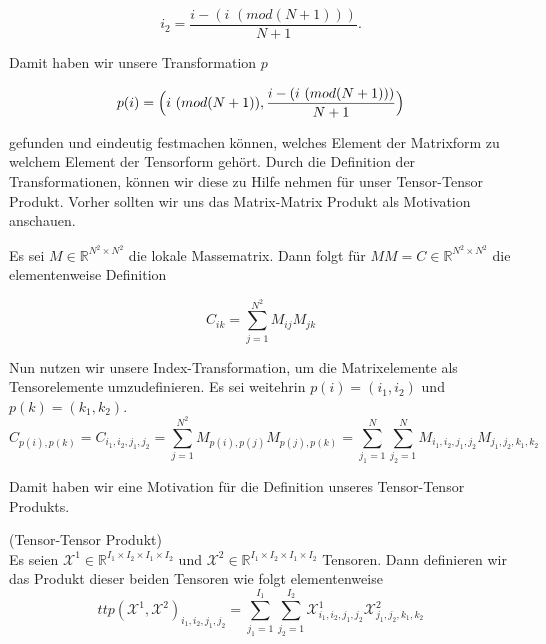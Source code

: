 \begin{equation} \label{eq:tupel3}
 i_2 = \dfrac{ i -  (i \, \, (mod (N+1))) } {N+1}.
\end{equation}

Damit haben wir unsere Transformation $p$

\begin{equation} \label{eq:p}
p(i)= \Big{(} i \, \, (mod (N+1)),  \dfrac{ i -  (i \, \, (mod (N+1))) } {N+1} \Big{)}
\end{equation}

gefunden und eindeutig festmachen können, welches Element der Matrixform zu welchem Element der Tensorform gehört.
Durch die Definition der Transformationen, können wir diese zu Hilfe nehmen für unser Tensor-Tensor Produkt. Vorher sollten wir uns das Matrix-Matrix Produkt als Motivation anschauen.

Es sei $M \in \mathbb{R}^{N^2 \times N^2}$ die lokale Massematrix. Dann folgt für $MM=C \in \mathbb{R}^{N^2 \times N^2}$ die elementenweise Definition

\begin{equation}
C_{ik}=\sum_{j=1}^{N^2} M_{ij} M_{jk}
\end{equation}

Nun nutzen wir unsere Index-Transformation, um die Matrixelemente als Tensorelemente umzudefinieren. Es sei weitehrin $p(i)=(i_1,i_2)$ und $p(k)=(k_1,k_2)$.
\begin{equation}
C_{p(i),p(k)} = C_{i_1,i_2,j_1,j_2} =  \sum_{j=1}^{N^2} M_{p(i),p(j)} M_{p(j),p(k)} = \sum_{j_1=1}^N \sum_{j_2=1}^N M_{i_1,i_2,j_1,j_2} M_{j_1,j_2,k_1,k_2} 
\end{equation}

Damit haben wir eine Motivation für die Definition unseres Tensor-Tensor Produkts.
\begin{Definition} (Tensor-Tensor Produkt) \\
Es seien $\pmb{\mathscr{X}}^1  \in \mathbb{R}^{I_1 \times I_2 \times I_1 \times I_2}$ und $\pmb{\mathscr{X}}^2 \in \mathbb{R}^{I_1 \times I_2 \times I_1 \times I_2}$ Tensoren.
Dann definieren wir das Produkt dieser beiden Tensoren wie folgt elementenweise
\begin{equation}
ttp(\pmb{\mathscr{X}}^1,\pmb{\mathscr{X}}^2)_{i_1,i_2,j_1,j_2}= \sum_{j_1=1}^{I_1} \sum_{j_2=1}^{I_2} \pmb{\mathscr{X}}^1_{i_1,i_2,j_1,j_2} \pmb{\mathscr{X}}^2_{j_1,j_2,k_1,k_2} 
\end{equation}
\end{Definition}

